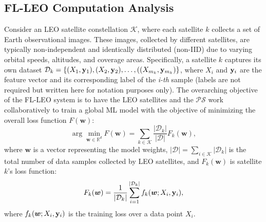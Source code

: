 \documentclass[letter,journal]{IEEEtran}
\newcommand{\blue}[1]{\textcolor{blue}{#1}}
\begin{document}
\subsection{FL-LEO Computation Analysis}
Consider an LEO satellite constellation $\mathcal K$, where each satellite $k$ collects a set of Earth observational images. These images, collected by different satellites, are typically non-independent and identically distributed (non-IID) due to varying orbital speeds, altitudes, and coverage areas. Specifically, a satellite $k$ captures its own dataset $\mathcal {D}_{k}=\{(X_1, {\bf y}_1), (X_{2}, {\bf y}_{2}), \dots, ((X_{m_{k}}, {\bf y}_{m_{k}})\}$, where $X_{i}$ and ${\bf y}_{i}$ are the feature vector and its corresponding label of the \textit{i-th} sample (labels are not required but written here for notation purposes only). %
The overarching objective of the FL-LEO system is to have the LEO satellites and the $\mathcal {PS}$ work collaboratively to train a global ML model with the objective of minimizing the overall loss function $F(\boldsymbol{w})$:
\begin{equation} \label{eqn1}
          \arg \min_{\boldsymbol{w} \in \mathbb{R}^{d}} F(\boldsymbol{w})= \sum_{k\in \mathcal K }{\frac{|\mathcal {D}_{k}|}{|\mathcal {D}|}{F_{k}{(\boldsymbol{w})}},}
\end{equation}
where $\boldsymbol{w}$ is a vector representing the model weights, $|\mathcal {D}|= \sum_{i\in \mathcal K} |\mathcal {D}_{k}|$ is the total number of data samples collected by LEO satellites, and $F_{k}(\boldsymbol{w})$ is satellite $k$'s loss function:
\begin{equation}\label{eqn:loss}
     F_{k}{(\boldsymbol{w})} = \frac{1}{|\mathcal {D}_{k}|}\sum_{i=1}^{|\mathcal {D}_{k}|} f_{k}(\boldsymbol{w}; X_{i}, {\bf y}_{i}),
\end{equation}
where  $f_{k}(\boldsymbol{w}; X_{i}, {\bf y}_{i})$ is the training loss over a data point $X_{i}$.
\end{document}
